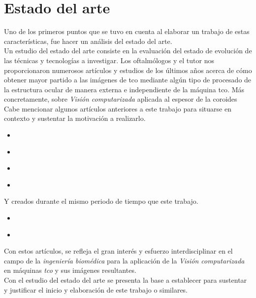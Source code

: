 \chapter{Estado del arte}\label{ch:estado_arte}
Uno de los primeros puntos que se tuvo en cuenta al elaborar un
trabajo de estas características, fue hacer un análisis del estado del
arte.\\
Un estudio del estado del arte consiste en la evaluación del estado de
evolución de las técnicas y tecnologías a investigar. Los oftalmólogos
y el tutor nos proporcionaron numerosos artículos y estudios de los
últimos años acerca de cómo obtener mayor partido a las imágenes de
\gls{tco} mediante algún tipo de procesado de la estructura ocular de
manera externa e independiente de la máquina \gls{tco}. Más
concretamente, sobre \emph{Visión computarizada} aplicada al espesor
de la \gls{coroides}\\
Cabe mencionar algunos artículos anteriores a este trabajo para
situarse en contexto y sustentar la motivación a realizarlo.
\begin{itemize}
\item \emph{\citep*[Automated choroidal segmentation of 1060 nm OCT in
    healthy and pathologic eyes using a statistical
    model]{kajic2012automated}}
\item \emph{\citep*[Automatic segmentation of the choroid in enhanced
    depth imaging optical coherence tomography
    images]{tian2013automatic}}
\item \emph{\citep*[Automatic segmentation of choroidal thickness in
    optical coherence tomography]{alonso2013automatic}}
\item \emph{\citep*[Segmentation of choroidal boundary in enhanced
    depth imaging OCTs using a multiresolution texture based modeling
    in graph cuts]{danesh2014segmentation}}
\end{itemize}
Y creados durante el mismo periodo de tiempo que este trabajo.
\begin{itemize}
\item \emph{\citep*[Evaluation of choroidal thickness via enhanced
    depth-imaging optical coherence tomography in patients with
    systemic hypertension]{gok2015evaluation}}
\item \emph{\citep*[Optical modelling of the human
    retina]{ara2015optical}}
\end{itemize}
Con estos artículos, se refleja el gran interés y esfuerzo
interdisciplinar en el campo de la \emph{ingeniería biomédica} para la
aplicación de la \emph{Visión computarizada} en máquinas
\emph{\gls{tco}} y sus imágenes resultantes.\\
Con el estudio del estado del arte se presenta la base a establecer
para sustentar y justificar el inicio y elaboración de este trabajo o
similares.
